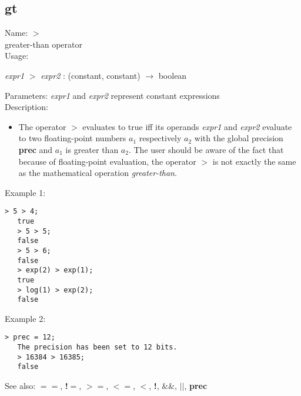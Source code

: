\subsection{ gt }
\noindent Name: \textbf{$>$}\\
greater-than operator\\

\noindent Usage: 
\begin{center}
\emph{expr1} \textbf{$>$} \emph{expr2} : (\textsf{constant}, \textsf{constant}) $\rightarrow$ \textsf{boolean}\\
\end{center}
Parameters: 
\emph{expr1} and \emph{expr2} represent constant expressions\\

\noindent Description: \begin{itemize}

\item The operator \textbf{$>$} evaluates to true iff its operands \emph{expr1} and
   \emph{expr2} evaluate to two floating-point numbers $a_1$
   respectively $a_2$ with the global precision \textbf{prec} and
   $a_1$ is greater than $a_2$. The user should
   be aware of the fact that because of floating-point evaluation, the
   operator \textbf{$>$} is not exactly the same as the mathematical
   operation \emph{greater-than}.
\end{itemize}
\noindent Example 1: 
\begin{center}\begin{minipage}{14.8cm}\begin{Verbatim}[frame=single]
   > 5 > 4;
   true
   > 5 > 5;
   false
   > 5 > 6;
   false
   > exp(2) > exp(1);
   true
   > log(1) > exp(2);
   false
\end{Verbatim}
\end{minipage}\end{center}
\noindent Example 2: 
\begin{center}\begin{minipage}{14.8cm}\begin{Verbatim}[frame=single]
   > prec = 12;
   The precision has been set to 12 bits.
   > 16384 > 16385;
   false
\end{Verbatim}
\end{minipage}\end{center}
See also: \textbf{$==$}, \textbf{!$=$}, \textbf{$>=$}, \textbf{$<=$}, \textbf{$<$}, \textbf{!}, \textbf{$\&\&$}, \textbf{$||$}, \textbf{prec}
